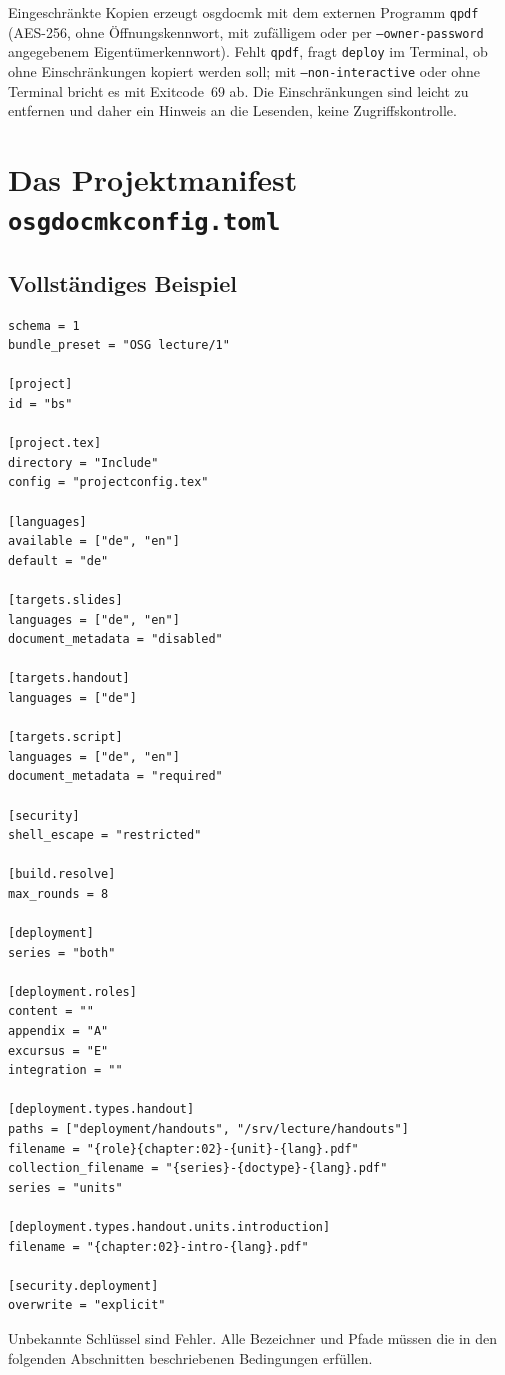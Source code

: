 \documentclass[
load-preamble+
]{osgdoc}
\begin{document}
Eingeschränkte Kopien erzeugt osgdocmk mit dem externen Programm \texttt{qpdf}
(AES-256, ohne Öffnungskennwort, mit zufälligem oder per
\texttt{--owner-password} angegebenem Eigentümerkennwort). Fehlt
\texttt{qpdf}, fragt \texttt{deploy} im Terminal, ob ohne Einschränkungen
kopiert werden soll; mit \texttt{--non-interactive} oder ohne Terminal bricht
es mit Exitcode~69 ab. Die Einschränkungen sind leicht zu entfernen und daher ein
Hinweis an die Lesenden, keine Zugriffskontrolle.

\section{Das Projektmanifest \texttt{osgdocmkconfig.toml}}

\subsection{Vollständiges Beispiel}

\begin{verbatim}
schema = 1
bundle_preset = "OSG lecture/1"

[project]
id = "bs"

[project.tex]
directory = "Include"
config = "projectconfig.tex"

[languages]
available = ["de", "en"]
default = "de"

[targets.slides]
languages = ["de", "en"]
document_metadata = "disabled"

[targets.handout]
languages = ["de"]

[targets.script]
languages = ["de", "en"]
document_metadata = "required"

[security]
shell_escape = "restricted"

[build.resolve]
max_rounds = 8

[deployment]
series = "both"

[deployment.roles]
content = ""
appendix = "A"
excursus = "E"
integration = ""

[deployment.types.handout]
paths = ["deployment/handouts", "/srv/lecture/handouts"]
filename = "{role}{chapter:02}-{unit}-{lang}.pdf"
collection_filename = "{series}-{doctype}-{lang}.pdf"
series = "units"

[deployment.types.handout.units.introduction]
filename = "{chapter:02}-intro-{lang}.pdf"

[security.deployment]
overwrite = "explicit"
\end{verbatim}

Unbekannte Schlüssel sind Fehler. Alle Bezeichner und Pfade müssen die in den
folgenden Abschnitten beschriebenen Bedingungen erfüllen.
\end{document}
